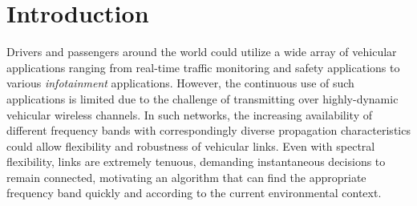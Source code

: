 
\section{Introduction}
\label{sec:introduction}


Drivers and passengers around the world could utilize a wide array of vehicular applications ranging from real-time traffic monitoring and
safety applications to various {\it infotainment} applications.
However, the continuous use of such applications is limited due to the challenge of transmitting over 
highly-dynamic vehicular wireless channels. 
In such networks, the increasing availability of different 
frequency bands with correspondingly diverse propagation characteristics could allow flexibility and 
robustness of vehicular links. Even with spectral flexibility, links are extremely tenuous, 
demanding instantaneous decisions to remain connected, motivating an algorithm that
can find the appropriate frequency band quickly and according to the current environmental context.

